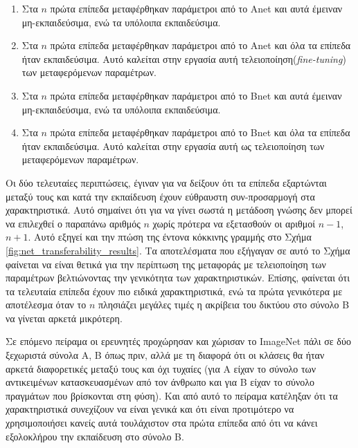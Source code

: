 \begin{enumerate}

\item Στα $n$ πρώτα επίπεδα μεταφέρθηκαν παράμετροι από το Anet και αυτά έμειναν μη-εκπαιδεύσιμα, ενώ τα υπόλοιπα εκπαιδεύσιμα.

\item Στα $n$ πρώτα επίπεδα μεταφέρθηκαν παράμετροι από το Anet και όλα τα επίπεδα ήταν εκπαιδεύσιμα. Αυτό καλείται στην εργασία αυτή τελειοποίηση(\textit{fine-tuning}) των μεταφερόμενων παραμέτρων.

\item Στα $n$ πρώτα επίπεδα μεταφέρθηκαν παράμετροι από το Βnet και αυτά έμειναν μη-εκπαιδεύσιμα, ενώ τα υπόλοιπα εκπαιδεύσιμα.

\item Στα $n$ πρώτα επίπεδα μεταφέρθηκαν παράμετροι από το Βnet και όλα τα επίπεδα ήταν εκπαιδεύσιμα. Αυτό καλείται στην εργασία αυτή ως τελειοποίηση των μεταφερόμενων παραμέτρων.

\end{enumerate}

Οι δύο τελευταίες περιπτώσεις, έγιναν για να δείξουν ότι τα επίπεδα εξαρτώνται μεταξύ τους και κατά την εκπαίδευση έχουν εύθραυστη συν-προσαρμογή στα χαρακτηριστικά. Αυτό σημαίνει ότι για να γίνει σωστά η μετάδοση γνώσης δεν μπορεί να επιλεχθεί ο παραπάνω αριθμός $n$ χωρίς πρότερα να εξετασθούν οι αριθμοί $n-1$, $n+1$. Αυτό εξηγεί και την πτώση της έντονα κόκκινης γραμμής στο Σχήμα \ref{fig:net_transferability_results}. Τα αποτελέσματα που εξήγαγαν σε αυτό το Σχήμα φαίνεται να είναι θετικά για την περίπτωση της μεταφοράς με τελειοποίηση των παραμέτρων βελτιώνοντας την γενικότητα των χαρακτηριστικών. Επίσης, φαίνεται ότι τα τελευταία επίπεδα έχουν πιο ειδικά χαρακτηριστικά, ενώ τα πρώτα γενικότερα με αποτέλεσμα όταν το $n$ πλησιάζει μεγάλες τιμές η ακρίβεια του δικτύου στο σύνολο B να γίνεται αρκετά μικρότερη.

Σε επόμενο πείραμα οι ερευνητές προχώρησαν και χώρισαν το ImageNet πάλι σε δύο ξεχωριστά σύνολα A, B όπως πριν, αλλά με τη διαφορά ότι οι κλάσεις θα ήταν αρκετά διαφορετικές μεταξύ τους και όχι τυχαίες (για A είχαν το σύνολο των αντικειμένων κατασκευασμένων από τον άνθρωπο και για Β είχαν το σύνολο πραγμάτων που βρίσκονται στη φύση). Και από αυτό το πείραμα κατέληξαν ότι τα χαρακτηριστικά συνεχίζουν να είναι γενικά και ότι είναι προτιμότερο να χρησιμοποιήσει κανείς αυτά τουλάχιστον στα πρώτα επίπεδα από ότι να κάνει εξολοκλήρου την εκπαίδευση στο σύνολο B.


